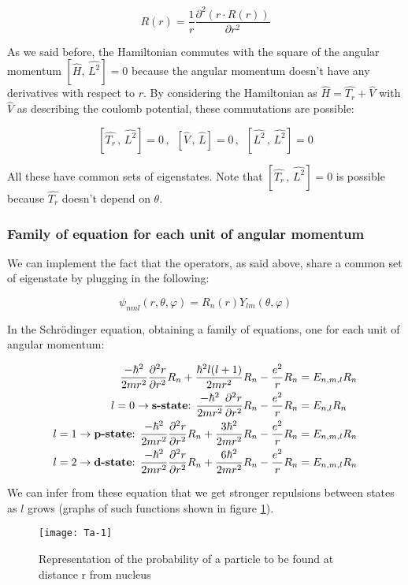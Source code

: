 		$$R(r)=\frac{1}{r}\frac{\partial^2(r\cdot R(r))}{\partial r^2}$$

		As we said before, the Hamiltonian commutes with the square of the angular momentum $[\hat{H},\,\hat{L^2}]=0$ because the angular momentum doesn't have any derivatives with respect to $r$.
		By considering the Hamiltonian as $\hat{H}=\hat{T_r}+\hat{V}$ with $\hat{V}$ as describing the coulomb potential, these commutations are possible:

		$$[\hat{T_r}\,,\,\hat{L^2}]=0\,,\,\,\,[\hat{V}\,,\,\hat{L}]=0\,,\,\,\,[\hat{L^2}\,,\,\hat{L^2}]=0$$

		All these have common sets of eigenstates.
		Note that $[\hat{T_r}\,,\,\hat{L^2}]=0$ is possible because $\hat{T_r}$ doesn't depend on $\theta$.

		\subsubsection{Family of equation for each unit of angular momentum}
		We can implement the fact that the operators, as said above, share a common set of eigenstate by plugging in the following:

		$$\psi_{nml}(r, \theta, \varphi) = R_n(r)Y_{lm}(\theta, \varphi)$$

		In the Schr\"odinger equation, obtaining a family of equations, one for each unit of angular momentum:

		\begin{align*}
			\frac{-\hbar^2}{2mr^2}\frac{\partial^2r}{\partial r^2}R_n+\frac{\hbar^2l(l+1)}{2mr^2}R_n-\frac{e^2}{r}R_n&=E_{n,m,l}R_n\\
			l=0 \rightarrow \text{\textbf{s-state}: } \frac{-\hbar^2}{2mr^2}\frac{\partial^2r}{\partial r^2}R_n-\frac{e^2}{r}R_n&=E_{n,l}R_n\\
			l=1 \rightarrow \text{\textbf{p-state}: }\frac{-\hbar^2}{2mr^2}\frac{\partial^2r}{\partial r^2}R_n+\frac{3\hbar^2}{2mr^2}R_n-\frac{e^2}{r}R_n&=E_{n,m,l}R_n\\
			l=2 \rightarrow \text{\textbf{d-state}: }\frac{-\hbar^2}{2mr^2}\frac{\partial^2r}{\partial r^2}R_n+\frac{6\hbar^2}{2mr^2}R_n-\frac{e^2}{r}R_n&=E_{n,m,l}R_n
		\end{align*}

		We can infer from these equation that we get stronger repulsions between states as $l$ grows (graphs of such functions shown in figure \ref{fig_swaves}).

		\begin{figure}[htbp!]
 			\centering
 			\texttt{[image: Ta-1]}
 			\caption{Representation of the probability of a particle to be found at distance r from nucleus}
 			\label{fig_swaves}
		\end{figure}

